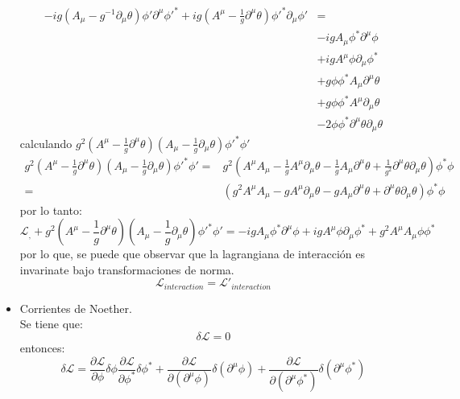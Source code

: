 \begin{itemize}
    \begin{align*}
        -ig \left(A_\mu- g^{-1}\partial_\mu \theta\right) {\phi}' \partial^\mu {\phi}'^* +ig \left(A^\mu- \frac{1}{g}\partial^\mu \theta\right) {\phi}'^* \partial_\mu {\phi}' &= \\
        &-igA_\mu \phi^* \partial^\mu \phi \\
        &+igA^\mu \phi \partial_\mu \phi^* \\
        &+ g\phi \phi^* A_\mu \partial^\mu \theta\\
        &+ g\phi \phi^* A^\mu \partial_\mu \theta\\
        &-2\phi \phi^* \partial^\mu \theta \partial_\mu \theta
    \end{align*}
    calculando $g^2 \left(A^\mu- \frac{1}{g}\partial^\mu \theta\right) \left(A_\mu- \frac{1}{g}\partial_\mu \theta\right) {\phi}'^* {\phi}'$
    \begin{align*}
        g^2 \left(A^\mu- \frac{1}{g}\partial^\mu \theta\right) \left(A_\mu- \frac{1}{g}\partial_\mu \theta\right) {\phi}'^* {\phi}' =& g^2 \left(A^\mu A_\mu - \frac{1}{g}A^\mu \partial_\mu \theta - \frac{1}{g}A_\mu \partial^\mu \theta + \frac{1}{g^2}\partial^\mu \theta \partial_\mu \theta \right) \phi^* \phi \\
        =&\left(g^2A^\mu A_\mu - gA^\mu \partial_\mu \theta - gA_\mu \partial^\mu \theta + \partial^\mu \theta \partial_\mu \theta \right) \phi^* \phi 
    \end{align*}
    por lo tanto:
    \begin{equation*}
        \mathcal{L}_,+g^2 \left(A^\mu- \frac{1}{g}\partial^\mu \theta\right) \left(A_\mu- \frac{1}{g}\partial_\mu \theta\right) {\phi}'^* {\phi}' = -igA_\mu \phi^* \partial^\mu \phi +igA^\mu \phi \partial_\mu \phi^* +g^2A^\mu A_\mu\phi \phi^*
    \end{equation*}
    por lo que, se puede que observar que la lagrangiana de interacción es invarinate bajo transformaciones de norma.
    \begin{equation*}
        \mathcal{L}_{interaction}={\mathcal{L}}'_{interaction}
    \end{equation*}
    \item Corrientes de Noether.\\
    Se tiene que:
    \begin{equation*}
        \delta \mathcal{L}=0
    \end{equation*}
    entonces:
    \begin{equation*}
        \delta \mathcal{L} = \frac{\partial \mathcal{L}}{\partial \phi} \delta \phi \frac{\partial \mathcal{L}}{\partial \phi^*} \delta \phi^*+ \frac{\partial \mathcal{L}}{\partial (\partial^\mu \phi)} \delta (\partial^\mu \phi)  +\frac{\partial \mathcal{L}}{\partial (\partial^\mu {\phi}^*)} \delta (\partial^\mu {\phi}^*)

\end{equation*}
\end{itemize}
